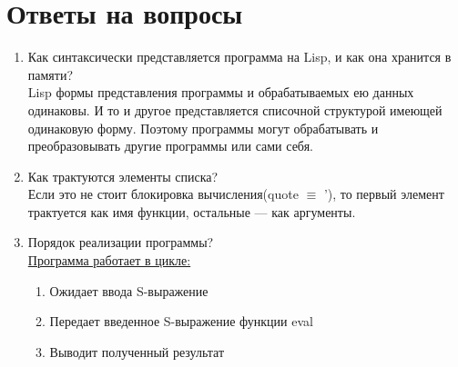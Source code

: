 \newpage
\section*{Ответы на вопросы}
\begin{enumerate}
    \item\Large{Как синтаксически представляется программа на Lisp, и как она хранится в памяти?}\\
    	Lisp формы представления программы и обрабатываемых ею данных одинаковы. И то и другое представляется списочной структурой имеющей одинаковую форму. Поэтому программы могут обрабатывать и преобразовывать другие программы или сами себя. 
    \item\Large{Как трактуются элементы списка?}\\
    	Если это  не стоит блокировка вычисления(quote $\equiv$ '), то первый элемент трактуется как имя функции, остальные — как аргументы.
    \item\Large{Порядок реализации программы?}\\
    	\underline{Программа работает в цикле:}
		\begin{enumerate}
			\item Ожидает ввода S-выражение
			\item Передает введенное S-выражение функции eval
			\item Выводит полученный результат
		\end{enumerate}
	\begin{minipage}[t]{1.0\textwidth}
	\raggedleft
		\centering{}
		\label{fig2}
	\end{minipage}\hfill
\end{enumerate}

